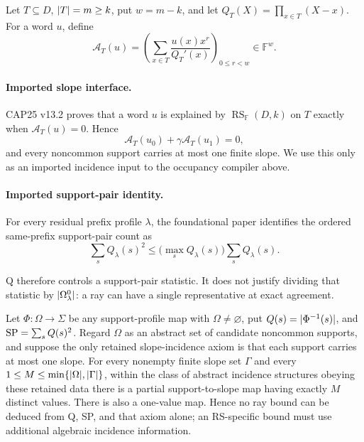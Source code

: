 \documentclass[11pt,a4paper]{amsart}
\numberwithin{equation}{section}
\theoremstyle{remark}
\DeclareMathOperator{\RS}{RS}\DeclareMathOperator{\MCA}{MCA}\DeclareMathOperator{\CA}{CA}
\newcommand{\F}{\mathbb F}\newcommand{\B}{\mathbb B}\newcommand{\K}{\mathbb K}\newcommand{\Z}{\mathbb Z}
\begin{document}
\begin{definition}
\label{def:pair-to-ray-map}
Let \(T\subseteq D\), \(\lvert T\rvert=m\ge k\), put \(w=m-k\), and let
\(Q_T(X)=\prod_{x\in T}(X-x)\).  For a word \(u\), define
\begin{equation}
 \mathcal A_T(u)=
 \left(
   \sum_{x\in T}\frac{u(x)x^r}{Q_T'(x)}
 \right)_{0\le r<w}\in\F^w.
 \label{eq:interpolation-functional}
\end{equation}
\end{definition}

\paragraph{Imported slope interface.}
CAP25 v13.2 \cite[Sec.~19 and Apps.~E--F]{CAP25v132} proves that a word
\(u\) is explained by \(\RS_\F(D,k)\) on \(T\) exactly when
\(\mathcal A_T(u)=0\).  Hence
\[
 \mathcal A_T(u_0)+\gamma\mathcal A_T(u_1)=0,
 \tag{SE}\label{eq:imported-slope-elimination}
\]
and every noncommon support carries at most one finite slope.  We use this only as an imported incidence input to the occupancy compiler above.


\paragraph{Imported support-pair identity.}
For every residual prefix profile \(\lambda\), the foundational paper
\cite[Sec.~19 and Apps.~E--F]{CAP25v132} identifies the ordered
same-prefix support-pair count as
\[
        \sum_sQ_\lambda(s)^2
        \le
        \bigl(\max_sQ_\lambda(s)\bigr)\sum_sQ_\lambda(s).
        \tag{SP$_0$}\label{eq:imported-support-pair}
\]


Q therefore controls a support-pair statistic.  It does not justify dividing
that statistic by \(\lvert \Omega^0_\lambda\rvert\): a ray can have a single
representative at exact agreement.

\begin{proposition}
\label{prop:q-sp-no-ray}
Let \(\Phi:\Omega\to\Sigma\) be any support-profile map with
\(\Omega\ne\varnothing\), put
\(Q(s)=\lvert \Phi^{-1}(s)\rvert\), and
\({\rm SP}=\sum_sQ(s)^2\).  Regard \(\Omega\) as an abstract set of
candidate noncommon supports, and suppose the only retained
slope-incidence axiom is that each support carries at most one slope.  For
every nonempty finite slope set \(\Gamma\) and every
\(1\le M\le\min\{\lvert \Omega\rvert,\lvert \Gamma\rvert\}\), within the class of abstract
incidence structures obeying these retained data there is a partial
support-to-slope map having exactly \(M\) distinct values.  There is also
a one-value map.  Hence no ray bound can be deduced from Q, SP, and that
axiom alone; an RS-specific bound must use additional algebraic incidence
information.
\end{proposition}
\end{document}
